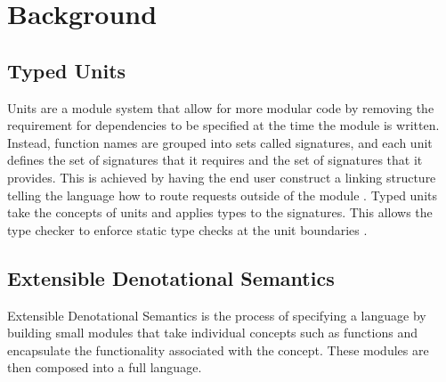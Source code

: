 
\section{Background}
\subsection{Typed Units}
Units are a module system that allow for more modular code by removing the requirement for dependencies to be specified at the time the module is written. Instead, function names are grouped into sets called signatures, and each unit defines the set of signatures that it requires and the set of signatures that it provides. This is achieved by having the end user construct a linking structure telling the language how to route requests outside of the module \cite{units}.
Typed units take the concepts of units and applies types to the signatures. This allows the type checker to enforce static type checks at the unit boundaries \cite{typed_units}.
\subsection{Extensible Denotational Semantics}
Extensible Denotational Semantics is the process of specifying a language by building small modules that take individual concepts such as functions and encapsulate the functionality associated with the concept. These modules are then composed into a full language\cite{eds}.